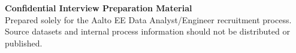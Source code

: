 \documentclass[11pt,a4paper]{article}
\begin{document}
\vfill

\begin{tcolorbox}[
    colback=AaltoNavy,
    colframe=AaltoNavy,
    boxrule=0pt,
    arc=2mm,
    left=4mm,
    right=4mm,
    top=3mm,
    bottom=3mm
]

\centering
\small
\color{white}

\textbf{Confidential Interview Preparation Material}
\\[2pt]

Prepared solely for the Aalto EE Data Analyst/Engineer recruitment
process. Source datasets and internal process information should not be
distributed or published.

\end{tcolorbox}
\end{document}

